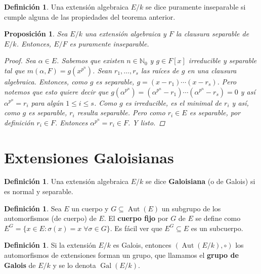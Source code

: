 \documentclass[12pt]{book}
\newtheorem{prop}[teo]{Proposición}
\theoremstyle{definition}
\newtheorem{defn}[teo]{Definición}
\newcommand{\NN}{\mathbb{N}}
\DeclareMathOperator{\Aut}{Aut}
\DeclareMathOperator{\Gal}{Gal}
\begin{document}
\begin{defn}
Una extensión algebraica $E/k$ se dice puramente inseparable si cumple alguna de las propiedades del teorema anterior.
\end{defn}

\begin{prop}
Sea $E/k$ una extensión algebraica y $F$ la clausura separable de $E/k$. Entonces, $E/F$ es puramente inseparable.
\begin{proof}
Sea $\alpha\in E$. Sabemos que existen $n\in\NN_0$ y $g\in F[x]$ irreducible y separable tal que $m(\alpha,F) = g(x^{p^n})$. Sean $r_1,\ldots , r_s$ las raíces de $g$ en una clausura algebraica. Entonces, como $g$ es separable, $g=(x-r_1)\cdots (x-r_s)$. Pero notemos que esto quiere decir que $g(\alpha^{p^n}) = (\alpha^{p^n} - r_1)\cdots (\alpha^{p^n}-r_s) = 0$ y así $\alpha^{p^n} = r_i$ para algún $1\leq i\leq s$. Como $g$ es irreducible, es el minimal de $r_i$ y así, como $g$ es separable, $r_i$ resulta separable. Pero como $r_i\in E$ es separable, por definición $r_i\in F$. Entonces $\alpha^{p^n} = r_i\in F$. Y listo.
\end{proof}
\end{prop}

\section{Extensiones Galoisianas}

\begin{defn}
Una extensión algebraica $E/k$ se dice \textbf{Galoisiana} (o de Galois) si es normal y separable.
\end{defn}

\begin{defn}
Sea $E$ un cuerpo y $G\subseteq \Aut(E)$ un subgrupo de los automorfismos (de cuerpo) de $E$. El \textbf{cuerpo fijo} por $G$ de $E$ se define como $E^G = \{x\in E : \sigma(x)=x \;\forall\sigma\in G\}$. Es fácil ver que $E^G \subseteq E$ es un subcuerpo.
\end{defn}

\begin{defn}
Si la extensión $E/k$ es Galois, entonces $(\Aut(E/k),\circ)$ los automorfismos de extensiones forman un grupo, que llamamos el \textbf{grupo de Galois} de $E/k$ y se lo denota $\Gal(E/k)$.
\end{defn}
\end{document}
